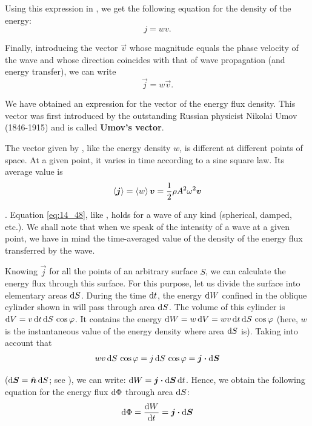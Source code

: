 \noindent
Using this expression in , we get the following equation for the density of the energy:
\begin{equation}\label{eq:14_46}
	j = wv.
\end{equation}

\noindent
Finally, introducing the vector $\vec{v}$ whose magnitude equals the phase velocity of the wave and whose direction coincides with that of wave propagation (and energy transfer), we can write
\begin{equation}\label{eq:14_47}
	\vec{j} = w \vec{v}.
\end{equation}

We have obtained an expression for the vector of the energy flux density.
This vector was first introduced by the outstanding Russian physicist Nikolai Umov (1846-1915) and is called \textbf{Umov's vector}.

The vector given by , like the energy density $w$, is different at different points of space.
At a given point, it varies in time according to a sine square law.
Its average value is
\begin{equation}\label{eq:14_48}
	\left\langle \boldsymbol{j} \right\rangle = \left\langle w \right\rangle \boldsymbol{v} = \frac{1}{2} \rho A^2 \omega^2 \boldsymbol{v}
\end{equation}

.
Equation \eqref{eq:14_48}, like , holds for a wave of any kind (spherical, damped, etc.).
We shall note that when we speak of the intensity of a wave at a given point, we have in mind the time-averaged value of the density of the energy flux transferred by the wave.

Knowing $\vec{j}$ for all the points of an arbitrary
surface $S$, we can calculate the energy flux through this surface.
For this purpose, let us divide the surface into elementary areas $\mathrm{d} S$.
During the time $\mathrm{d} t$, the energy $\mathrm{d} W$ confined in the oblique cylinder shown in  will pass through area $\mathrm{d} S$.
The volume of this cylinder is $\mathrm{d} V = v\, \mathrm{d} t\, \mathrm{d} S\, \cos\varphi$.
It contains the energy $\mathrm{d} W = w\, \mathrm{d} V = wv\, \mathrm{d} t\, \mathrm{d} S\, \cos\varphi$ (here, $w$ is the instantaneous value of the energy density where area $\mathrm{d} S$ is).
Taking into account that
\begin{equation*}
	wv\, \mathrm{d} S\, \cos\varphi = j\, \mathrm{d} S\, \cos\varphi = \boldsymbol{j} \boldsymbol{\cdot} \mathrm{d}\boldsymbol{S}
\end{equation*}

\noindent
($\mathrm{d}\boldsymbol{S}=\hat{\boldsymbol{n}}\,\mathrm{d} S$; see ), we can write: $\mathrm{d} W = \boldsymbol{j} \boldsymbol{\cdot} \mathrm{d}\boldsymbol{S}\, \mathrm{d} t$.
Hence, we obtain the following equation for the energy flux $\mathrm{d}\Phi$ through area $\mathrm{d} S$:
\begin{equation}\label{eq:14_49}
	\mathrm{d}\Phi = \dfrac{\mathrm{d} W}{\mathrm{d} t} = \boldsymbol{j} \boldsymbol{\cdot} \mathrm{d}\boldsymbol{S}
\end{equation}

